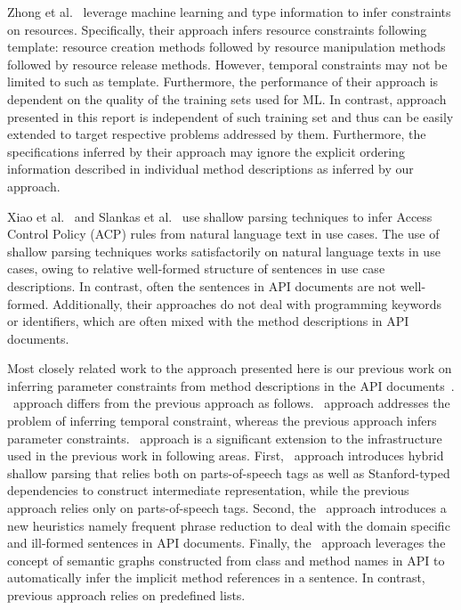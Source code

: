 Zhong et al.~\cite{zhong09SE} leverage machine learning and type information to infer constraints on resources.
Specifically, their approach infers resource constraints following template: resource creation methods followed by resource manipulation methods followed by resource release methods.
However, temporal constraints may not be limited to such as template. 
Furthermore, the performance of their approach is dependent on the quality of the training sets used for ML.
In contrast, approach presented in this report is independent of such training set and thus can be easily extended to target respective problems addressed by them. Furthermore, the specifications inferred by their approach may ignore the explicit ordering information described in individual method descriptions as inferred by our approach.


Xiao et al.~\cite{XiaoFSE2012} and Slankas et al.~\cite{johnSlankasPASSAT13} use shallow parsing techniques to infer Access Control Policy (ACP) rules from natural language text in use cases.
The use of shallow parsing techniques works satisfactorily on natural language texts in use cases, owing to relative well-formed structure of sentences in use case descriptions.
In contrast, often the sentences in API documents are not well-formed.
Additionally, their approaches do not deal with programming keywords or identifiers, which are often mixed with the method descriptions in API documents.

Most closely related work to the approach presented here is our previous work on inferring parameter constraints from method descriptions in the API documents~\cite{pandita12:inferring}.
\tool\ approach differs from the previous approach as follows.
\tool\ approach addresses the problem of inferring temporal constraint, whereas the previous approach infers parameter constraints.
\tool\ approach is a significant extension to the infrastructure used in the previous work in following areas.
First, \tool\ approach introduces hybrid shallow parsing that relies both on parts-of-speech tags as well as Stanford-typed dependencies to construct intermediate representation, while the previous approach relies only on parts-of-speech tags.
Second, the \tool\ approach introduces a new heuristics namely frequent phrase reduction to deal with the domain specific and ill-formed sentences in API documents.
Finally, the \tool\ approach leverages the concept of semantic graphs constructed from class and method names in API to automatically infer the implicit method references in a sentence. In contrast, previous approach relies on predefined lists.  


